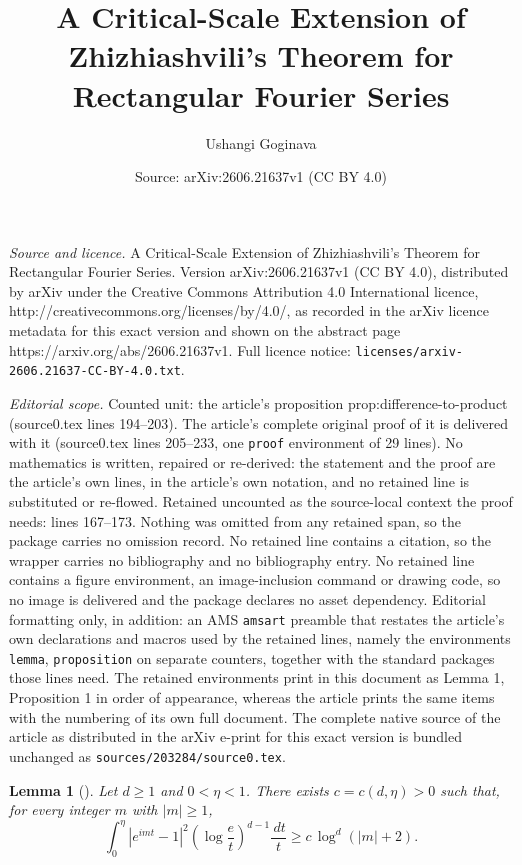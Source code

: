 \documentclass[10pt,a4paper]{amsart}
\title{A Critical-Scale Extension of Zhizhiashvili's Theorem for Rectangular Fourier Series}
\author{Ushangi Goginava}
\date{Source: arXiv:2606.21637v1 (CC BY 4.0)}
\newtheorem{lemma}{Lemma}
\newcommand{\abs}[1]{\left\lvert #1\right\rvert}
\newcommand{\dd}{\,d}
\begin{document}
\maketitle

\noindent\emph{Source and licence.} A Critical-Scale Extension of Zhizhiashvili's Theorem for Rectangular Fourier Series. Version arXiv:2606.21637v1 (CC BY 4.0), distributed by arXiv under the Creative Commons Attribution 4.0 International licence, http://creativecommons.org/licenses/by/4.0/, as recorded in the arXiv licence metadata for this exact version and shown on the abstract page https://arxiv.org/abs/2606.21637v1. Full licence notice: \texttt{licenses/arxiv-2606.21637-CC-BY-4.0.txt}.\par\smallskip

\noindent\textit{Editorial scope.} Counted unit: the article's proposition prop:difference-to-product (source0.tex lines 194--203). The article's complete original proof of it is delivered with it (source0.tex lines 205--233, one \texttt{proof} environment of 29 lines). No mathematics is written, repaired or re-derived: the statement and the proof are the article's own lines, in the article's own notation, and no retained line is substituted or re-flowed.  Retained uncounted as the source-local context the proof needs: lines 167--173.  Nothing was omitted from any retained span, so the package carries no omission record.  No retained line contains a citation, so the wrapper carries no bibliography and no bibliography entry.  No retained line contains a figure environment, an image-inclusion command or drawing code, so no image is delivered and the package declares no asset dependency.  Editorial formatting only, in addition: an AMS \texttt{amsart} preamble that restates the article's own declarations and macros used by the retained lines, namely the environments \texttt{lemma}, \texttt{proposition} on separate counters, together with the standard packages those lines need.  The retained environments print in this document as Lemma 1, Proposition 1 in order of appearance, whereas the article prints the same items with the numbering of its own full document.  The complete native source of the article as distributed in the arXiv e-print for this exact version is bundled unchanged as \texttt{sources/203284/source0.tex}.
\begin{lemma}[]\label{lem:oscillation}
Let $d\ge1$ and $0<\eta<1$. There exists $c=c(d,\eta)>0$ such that, for every integer $m$ with $\abs{m}\ge1$,
\begin{equation}\label{eq:oscillation}
 \int_0^\eta \abs{e^{imt}-1}^2\left(\log\frac et\right)^{d-1}\frac{\dd t}{t}
 \ge c\,\log^d(\abs{m}+2).
\end{equation}
\end{lemma}
\end{document}
